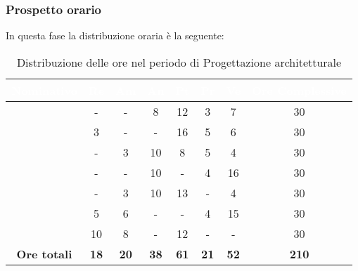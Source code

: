 \subsubsection{Prospetto orario}
In questa fase la distribuzione oraria è la seguente:
\begin{table}[H]
	\begin{center}
		\begin{tabular}{ |c c c c c c c c| }
		\rowcolor{darkblue} 
		\textcolor{white}{\textbf{Nominativo}} & \textcolor{white}{\textbf{Re}} & \textcolor{white}{\textbf{Am}} & \textcolor{white}{\textbf{An}} & \textcolor{white}{\textbf{Pt}} & \textcolor{white}{\textbf{Pr}} & \textcolor{white}{\textbf{Ve}} & \textcolor{white}{\textbf{Ore Complessive}} \\ \hline
		\BL 	& -  	& -  	& 8 	& 12 	& 3 	& 7 	& 30 \\ \hline
		\FF 	& 3  	& -  	& - 	& 16 	& 5 	& 6  	& 30 \\ \hline
		\MM 	& -  	& 3  	& 10 	& 8 	& 5 	& 4  	& 30 \\ \hline
		\PC 	& - 	& -  	& 10 	& - 	& 4 	& 16 	& 30 \\ \hline
		\TG 	& -  	& 3 	& 10 	& 13 	& - 	& 4 	& 30 \\ \hline
		\TL 	& 5  	& 6 	& - 	& - 	& 4 	& 15 	& 30 \\ \hline
		\VD 	& 10  	& 8  	& - 	& 12 	& - 	& -  	& 30 \\ \hline
		\textbf{Ore totali} & \textbf{18} & \textbf{20} & \textbf{38} & \textbf{61} & \textbf{21} & \textbf{52} & \textbf{210} \\ \hline
		\end{tabular}
	\caption{Distribuzione delle ore nel periodo di Progettazione architetturale}
	\end{center}
\end{table}
